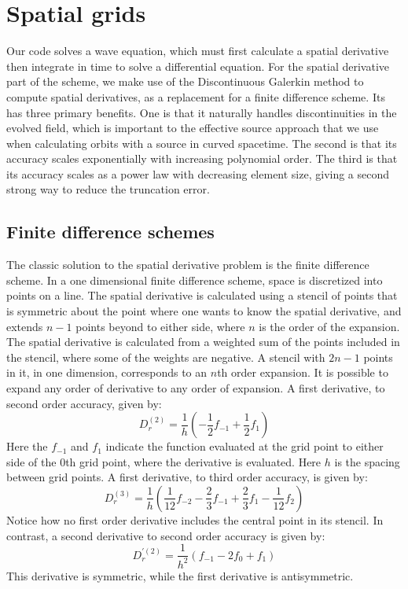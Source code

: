 \section{Spatial grids}
Our code solves a wave equation, which must first calculate a spatial derivative then integrate in time to solve a differential equation. For the spatial derivative part of the scheme, we make use of the Discontinuous Galerkin method to compute spatial derivatives, as a replacement for a finite difference scheme. Its has three primary benefits. One is that it naturally handles discontinuities in the evolved field, which is important to the effective source approach that we use when calculating orbits with a source in curved spacetime. The second is that its accuracy scales exponentially with increasing polynomial order. The third is that its accuracy scales as a power law with decreasing element size, giving a second strong way to reduce the truncation error.


\subsection{Finite difference schemes}
The classic solution to the spatial derivative problem is the finite difference scheme. In a one dimensional finite difference scheme, space is discretized into points on a line. The spatial derivative is calculated using a stencil of points that is symmetric about the point where one wants to know the spatial derivative, and extends $n-1$ points beyond to either side, where $n$ is the order of the expansion. The spatial derivative is calculated from a weighted sum of the points included in the stencil, where some of the weights are negative. A stencil with $2n-1$ points in it, in one dimension, corresponds to an $n$th order expansion. It is possible to expand any order of derivative to any order of expansion. A first derivative, to second order accuracy, given by:
\begin{equation}
  D_r^{(2)}=\frac{1}{h}(-\frac{1}{2}f_{-1}+\frac{1}{2}f_1)
\end{equation}
Here the $f_{-1}$ and $f_1$ indicate the function evaluated at the grid point to either side of the $0$th grid point, where the derivative is evaluated. Here $h$ is the spacing between grid points. A first derivative, to third order accuracy, is given by:
\begin{equation}
  D_r^{(3)}=\frac{1}{h}(\frac{1}{12}f_{-2}-\frac{2}{3}f_{-1}+\frac{2}{3}f_1-\frac{1}{12}f_2)
\end{equation}
Notice how no first order derivative includes the central point in its stencil. In contrast, a second derivative to second order accuracy is given by:
\begin{equation}
  D_r^{\prime (2)}=\frac{1}{h^2}(f_{-1}-2f_0+f_1)
\end{equation}
This derivative is symmetric, while the first derivative is antisymmetric.

